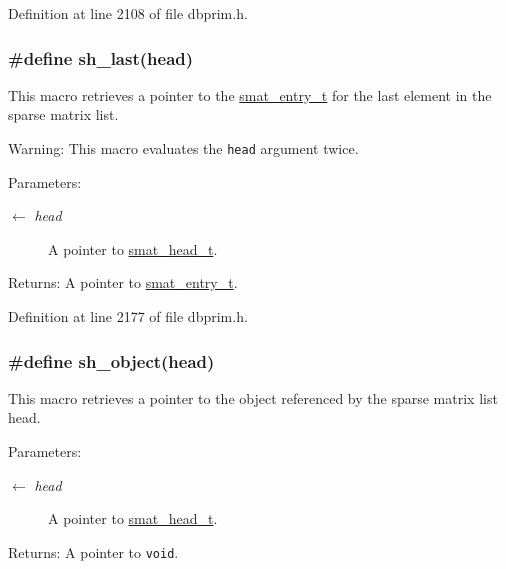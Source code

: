 Definition at line 2108 of file dbprim.h.\hypertarget{group__dbprim__smat_ga51}{
\subsubsection[sh\_\-last]{\setlength{\rightskip}{0pt plus 5cm}\#define sh\_\-last(head)}}
\label{group__dbprim__smat_ga51}


This macro retrieves a pointer to the \hyperlink{group__dbprim__smat_ga2}{smat\_\-entry\_\-t} for the last element in the sparse matrix list.

\begin{Desc}
\item[Warning:]This macro evaluates the {\tt head} argument twice.\end{Desc}
\begin{Desc}
\item[Parameters:]
\begin{description}
\item[\mbox{$\leftarrow$} {\em head}]A pointer to \hyperlink{group__dbprim__smat_ga1}{smat\_\-head\_\-t}.\end{description}
\end{Desc}
\begin{Desc}
\item[Returns:]A pointer to \hyperlink{group__dbprim__smat_ga2}{smat\_\-entry\_\-t}.\end{Desc}


Definition at line 2177 of file dbprim.h.\hypertarget{group__dbprim__smat_ga52}{
\subsubsection[sh\_\-object]{\setlength{\rightskip}{0pt plus 5cm}\#define sh\_\-object(head)}}
\label{group__dbprim__smat_ga52}


This macro retrieves a pointer to the object referenced by the sparse matrix list head.

\begin{Desc}
\item[Parameters:]
\begin{description}
\item[\mbox{$\leftarrow$} {\em head}]A pointer to \hyperlink{group__dbprim__smat_ga1}{smat\_\-head\_\-t}.\end{description}
\end{Desc}
\begin{Desc}
\item[Returns:]A pointer to {\tt void}.\end{Desc}


